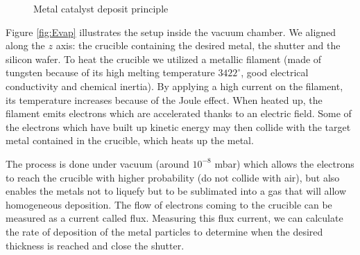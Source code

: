 \documentclass[a4paper,12pt,twoside]{article}
\begin{document}
\begin{figure}[h]
    \centering
    \caption{Metal catalyst deposit principle}
    \label{fig:deposition_system}
\end{figure}

Figure \ref{fig:Evap} illustrates the setup inside the vacuum chamber. We aligned along the $z$ axis: the crucible containing the desired metal, the shutter and the silicon wafer. To heat the crucible we utilized a metallic filament (made of tungsten because of its high melting temperature $3422^{\circ}$, good electrical conductivity and chemical inertia). By applying a high current on the filament, its temperature increases because of the Joule effect. When heated up, the filament emits electrons which are accelerated thanks to an electric field. Some of the electrons which have built up kinetic energy may then collide with the target metal contained in the crucible, which heats up the metal.

The process is done under vacuum (around $10^{-8}$ mbar) which allows the electrons to reach the crucible with higher probability (do not collide with air), but also enables the metals not to liquefy but to be sublimated into a gas that will allow homogeneous deposition. The flow of electrons coming to the crucible can be measured as a current called flux. Measuring this flux current, we can calculate the rate of deposition of the metal particles to determine when the desired thickness is reached and close the shutter.
\end{document}
